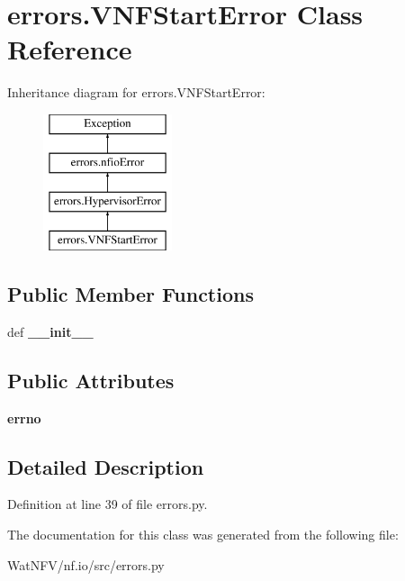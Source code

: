 \hypertarget{classerrors_1_1VNFStartError}{\section{errors.\-V\-N\-F\-Start\-Error Class Reference}
\label{classerrors_1_1VNFStartError}
}
Inheritance diagram for errors.\-V\-N\-F\-Start\-Error\-:\begin{figure}[H]
\begin{center}
\leavevmode
\includegraphics[height=4.000000cm]{classerrors_1_1VNFStartError}
\end{center}
\end{figure}
\subsection*{Public Member Functions}
\begin{DoxyCompactItemize}
\item 
\hypertarget{classerrors_1_1VNFStartError_a962405d619aa42c3732e6273a0e85800}{def {\bfseries \-\_\-\-\_\-init\-\_\-\-\_\-}}\label{classerrors_1_1VNFStartError_a962405d619aa42c3732e6273a0e85800}

\end{DoxyCompactItemize}
\subsection*{Public Attributes}
\begin{DoxyCompactItemize}
\item 
\hypertarget{classerrors_1_1VNFStartError_afffa090d568ffafa017d96efa6266a3f}{{\bfseries errno}}\label{classerrors_1_1VNFStartError_afffa090d568ffafa017d96efa6266a3f}

\end{DoxyCompactItemize}


\subsection{Detailed Description}


Definition at line 39 of file errors.\-py.



The documentation for this class was generated from the following file\-:\begin{DoxyCompactItemize}
\item 
Wat\-N\-F\-V/nf.\-io/src/errors.\-py\end{DoxyCompactItemize}
